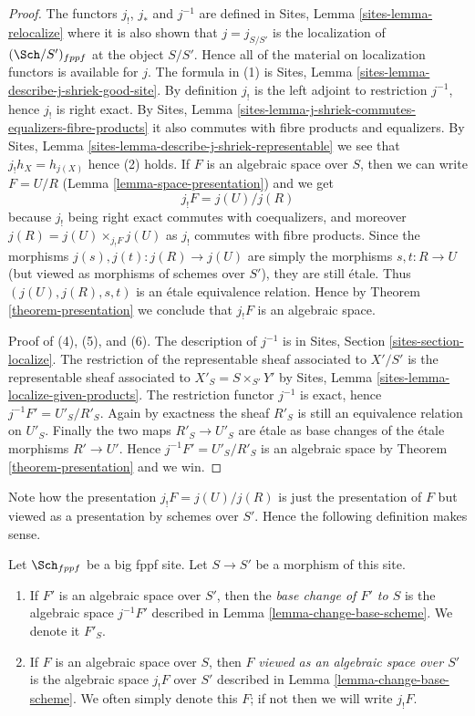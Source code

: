 \begin{proof}
The functors $j_!$, $j_*$ and $j^{-1}$ are defined in
Sites, Lemma \ref{sites-lemma-relocalize}
where it is also shown that $j = j_{S/S'}$ is the localization
of $(\Sch/S')_{fppf}$ at the object $S/S'$. Hence
all of the material on localization functors is available for $j$.
The formula in (1) is
Sites, Lemma \ref{sites-lemma-describe-j-shriek-good-site}.
By definition $j_!$ is the left adjoint to restriction $j^{-1}$,
hence $j_!$ is right exact. By
Sites, Lemma \ref{sites-lemma-j-shriek-commutes-equalizers-fibre-products}
it also commutes with fibre products and equalizers.
By
Sites, Lemma \ref{sites-lemma-describe-j-shriek-representable}
we see that $j_!h_X = h_{j(X)}$ hence (2) holds.
If $F$ is an algebraic space over $S$, then we can write $F = U/R$
(Lemma \ref{lemma-space-presentation})
and we get
$$
j_!F = j(U)/j(R)
$$
because $j_!$ being right exact commutes with coequalizers, and moreover
$j(R) = j(U) \times_{j_!F} j(U)$ as $j_!$ commutes with fibre products.
Since the morphisms $j(s), j(t) : j(R) \to j(U)$ are simply the morphisms
$s, t : R \to U$ (but viewed as morphisms of schemes over $S'$), they
are still \'etale. Thus $(j(U), j(R), s, t)$ is an \'etale equivalence relation.
Hence by
Theorem \ref{theorem-presentation}
we conclude that $j_!F$ is an algebraic space.

\medskip\noindent
Proof of (4), (5), and (6). The description of $j^{-1}$ is in
Sites, Section \ref{sites-section-localize}.
The restriction of the representable sheaf associated to $X'/S'$
is the representable sheaf associated to
$X'_S = S \times_{S'} Y'$ by
Sites, Lemma \ref{sites-lemma-localize-given-products}.
The restriction functor $j^{-1}$ is exact, hence $j^{-1}F' = U'_S/R'_S$.
Again by exactness the sheaf $R'_S$ is still an equivalence relation on
$U'_S$. Finally the two maps $R'_S \to U'_S$ are \'etale as base changes
of the \'etale morphisms $R' \to U'$. Hence $j^{-1}F' = U'_S/R'_S$ is
an algebraic space by
Theorem \ref{theorem-presentation}
and we win.
\end{proof}

\noindent
Note how the presentation $j_!F = j(U)/j(R)$ is just the presentation
of $F$ but viewed as a presentation by schemes over $S'$. Hence the
following definition makes sense.

\begin{definition}
\label{definition-base-change}
Let $\Sch_{fppf}$ be a big fppf site.
Let $S \to S'$ be a morphism of this site.
\begin{enumerate}
\item If $F'$ is an algebraic space over $S'$, then the
{\it base change of $F'$ to $S$} is the
algebraic space $j^{-1}F'$ described in
Lemma \ref{lemma-change-base-scheme}. We denote it $F'_S$.
\item If $F$ is an algebraic space over $S$, then $F$
{\it viewed as an algebraic space over $S'$}
is the algebraic space $j_!F$ over $S'$ described in
Lemma \ref{lemma-change-base-scheme}. We often simply denote this
$F$; if not then we will write $j_!F$.
\end{enumerate}
\end{definition}

